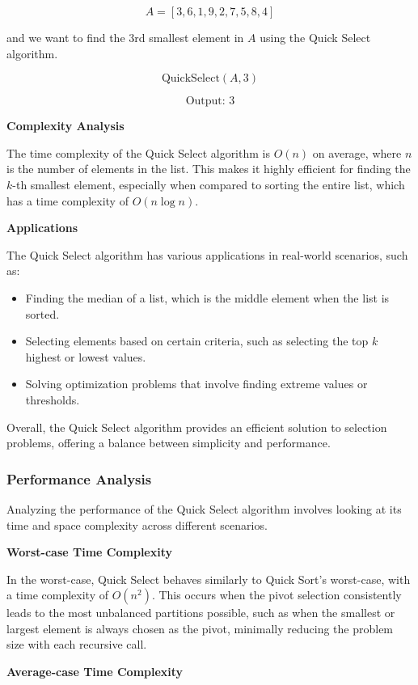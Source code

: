 \documentclass[12pt]{book} %
\begin{document}
\[
A = [3, 6, 1, 9, 2, 7, 5, 8, 4]
\]

and we want to find the 3rd smallest element in $A$ using the Quick Select algorithm.

\[
\text{QuickSelect}(A, 3)
\]

\[
\text{Output: } 3
\]

\textbf{Complexity Analysis}

The time complexity of the Quick Select algorithm is $O(n)$ on average, where $n$ is the number of elements in the list. This makes it highly efficient for finding the $k$-th smallest element, especially when compared to sorting the entire list, which has a time complexity of $O(n \log n)$.

\textbf{Applications}

The Quick Select algorithm has various applications in real-world scenarios, such as:

\begin{itemize}
    \item Finding the median of a list, which is the middle element when the list is sorted.
    \item Selecting elements based on certain criteria, such as selecting the top $k$ highest or lowest values.
    \item Solving optimization problems that involve finding extreme values or thresholds.
\end{itemize}

Overall, the Quick Select algorithm provides an efficient solution to selection problems, offering a balance between simplicity and performance.

\subsubsection{Performance Analysis}
Analyzing the performance of the Quick Select algorithm involves looking at its time and space complexity across different scenarios.

\textbf{Worst-case Time Complexity}

In the worst-case, Quick Select behaves similarly to Quick Sort's worst-case, with a time complexity of \(O(n^2)\). This occurs when the pivot selection consistently leads to the most unbalanced partitions possible, such as when the smallest or largest element is always chosen as the pivot, minimally reducing the problem size with each recursive call.

\textbf{Average-case Time Complexity}
\end{document}
